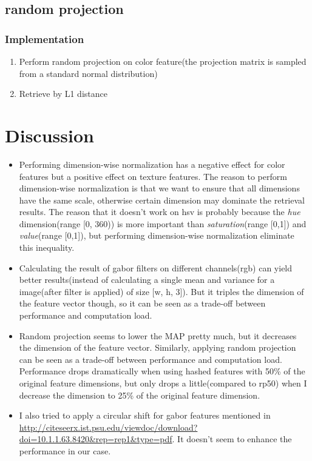 \documentclass{article}
\begin{document}
\subsection{random projection}

\subsubsection{Implementation}
\begin{enumerate}
\item Perform random projection on color feature(the projection matrix is sampled from a standard normal distribution)
\item Retrieve by L1 distance
\end{enumerate}

\section{Discussion}
\begin{itemize}
    \item Performing dimension-wise normalization has a negative effect for color features but a positive effect on texture features.
      The reason to perform dimension-wise normalization is that we want to ensure that all dimensions have the same scale, otherwise certain dimension may dominate the retrieval results. The reason that it doesn't work on hsv is probably because the \emph{hue} dimension(range [0, 360)) is more important than \emph{saturation}(range [0,1]) and \emph{value}(range [0,1]), but performing dimension-wise normalization eliminate this inequality.

    \item Calculating the result of gabor filters on different channels(rgb) can yield better results(instead of calculating a single mean and variance for a image(after filter is applied) of size [w, h, 3]). But it triples the dimension of the feature vector though, so it can be seen as a trade-off between performance and computation load.

    \item Random projection seems to lower the MAP pretty much, but it decreases the dimension of the feature vector. Similarly, applying random projection can be seen as a trade-off between performance and computation load. Performance drops dramatically when using hashed features with 50\% of the original feature dimensions, but only drops a little(compared to rp50) when I decrease the dimension to 25\% of the original feature dimension.

    \item I also tried to apply a circular shift for gabor features mentioned in \url{http://citeseerx.ist.psu.edu/viewdoc/download?doi=10.1.1.63.8420&rep=rep1&type=pdf}. It doesn't seem to enhance the performance in our case.

\end{itemize}
\end{document}
